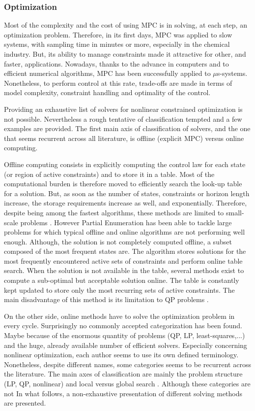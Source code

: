 \documentclass[a4paper, 12pt]{report}
\begin{document}
\subsubsection{Optimization}
Most of the complexity and the cost of using MPC is in solving, at each step, an optimization problem. Therefore, in its first days, MPC was applied to slow systems, with sampling time in minutes or more, especially in the chemical industry. But, its ability to manage constraints made it attractive for other, and faster, applications. Nowadays, thanks to the advance in computers and to efficient numerical algorithms, MPC has been successfully applied to $\mu$s-systems. Nonetheless, to perform control at this rate, trade-offs are made in terms of model complexity, constraint handling and optimality of the control. 

Providing an exhaustive list of solvers for nonlinear constrained optimization is not possible. Nevertheless a rough tentative of classification tempted and a few examples are provided. The first main axis of classification of solvers, and the one that seems recurrent across all literature, is offline (explicit MPC) versus online computing. 

Offline computing consists in explicitly computing the control law for each state (or region of active constraints) and to store it in a table. Most of the computational burden is therefore moved to efficiently search the look-up table for a solution. But, as soon as the number of states, constraints or horizon length increase, the storage requirements increase as well, and exponentially. Therefore, despite being among the fastest algorithms, these methods are limited to small-scale problems \cite{Haverbeke2011}. However Partial Enumeration has been able to tackle large problems for which typical offline and online algorithms are not performing well enough. Although, the solution is not completely computed offline, a subset composed of the most frequent states are. The algorithm stores solutions for the most frequently encountered active sets of constraints and perform online table search. When the solution is not available in the table, several methods exist to compute a sub-optimal but acceptable solution online. The table is constantly kept updated to store only the most recurring sets of active constraints. The main disadvantage of this method is its limitation to QP problems \cite{Pannocchia2007}. 

On the other side, online methods have to solve the optimization problem in every cycle. Surprisingly no commonly accepted categorization has been found. Maybe because of the enormous quantity of problems (QP, LP, least-squares,...) and the huge, already available number of efficient solvers. Especially concerning nonlinear optimization, each author seems to use its own defined terminology. Nonetheless, despite different names, some categories seems to be recurrent across the literature. The main axes of classification are mainly the problem structure (LP, QP, nonlinear) and local versus global search \cite{Haverbeke2011, Nocedal1999, Zheng2015}. Although these categories are not  In what follows, a non-exhaustive presentation of different solving methods are presented.
\end{document}
